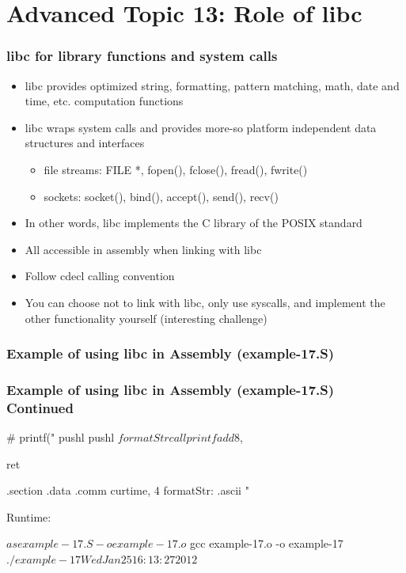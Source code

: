 \documentclass[11pt,xcolor=dvipsnames]{beamer}
\newcommand{\vs}{\vspace{0.5em}}
\newcommand{\mvs}{\vspace{-0.95em}}
\begin{document}
\section{Advanced Topic 13: Role of libc}

\begin{frame}[fragile,t]
\frametitle{{\ttfamily libc} for library functions and system calls}
\begin{itemize}
  \item {\ttfamily libc} provides optimized string, formatting, pattern matching, math, date and time, etc. computation functions
  \item {\ttfamily libc} wraps system calls and provides more-so platform independent data structures and interfaces
  \begin{itemize}
    \item file streams: {\ttfamily FILE *, fopen(), fclose(), fread(), fwrite()}
    \item sockets: {\ttfamily socket(), bind(), accept(), send(), recv()}
  \end{itemize}
  \item In other words, {\ttfamily libc} implements the C library of the POSIX standard
  \vs
  \vs
  \pause
  \item All accessible in assembly when linking with {\ttfamily libc}
  \item Follow {\ttfamily cdecl} calling convention
  \item You can choose not to link with libc, only use syscalls, and implement the other functionality yourself (interesting challenge)
\end{itemize}
\end{frame}

\begin{frame}[fragile,t]
\mvs
\frametitle{Example of using libc in Assembly (example-17.S)}
\end{frame}

\begin{frame}[fragile,t]
\mvs
\frametitle{Example of using libc in Assembly (example-17.S) Continued}
\begin{gascode}
  # printf("%
  pushl %
  pushl $formatStr
  call printf
  add $8, %

  ret

.section .data
.comm curtime, 4
formatStr:  .ascii "%
\end{gascode}
{\small Runtime:}
\begin{textcode}
$ as example-17.S -o example-17.o
$ gcc example-17.o -o example-17
$ ./example-17
Wed Jan 25 16:13:27 2012
$
\end{textcode}
\end{frame}
\end{document}
